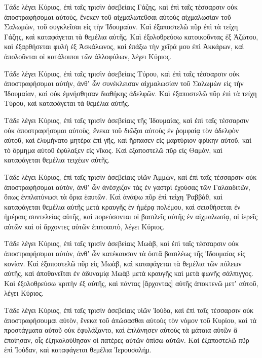 \begin{spacing}{1.1}
\begin{multicols}{2}
Τάδε λέγει Κύριος, ἐπὶ ταῖς τρισὶν ἀσεβείαις Γάζης, καὶ ἐπὶ ταῖς τέσσαρσιν οὐκ ἀποστραφήσομαι αὐτοὺς, ἕνεκεν τοῦ αἰχμαλωτεῦσαι αὐτοὺς αἰχμαλωσίαν τοῦ Σαλωμὼν, τοῦ συγκλεῖσαι εἰς τὴν Ἰδουμαίαν.
Καὶ ἐξαποστελῶ πῦρ ἐπὶ τὰ τείχη Γάζης, καὶ καταφάγεται τὰ θεμέλια αὐτῆς.
Καὶ ἐξολοθρεύσω κατοικοῦντας ἐξ Ἀζώτου, καὶ ἐξαρθήσεται φυλὴ ἐξ Ἀσκάλωνος, καὶ ἐπάξω τὴν χεῖρά μου ἐπὶ Ἀκκάρων, καὶ ἀπολοῦνται οἱ κατάλοιποι τῶν ἀλλοφύλων, λέγει Κύριος.

Τάδε λέγει Κύριος, ἐπὶ ταῖς τρισὶν ἀσεβείαις Τύρου, καὶ ἐπὶ ταῖς τέσσαρσιν οὐκ ἀποστραφήσομαι αὐτὴν, ἀνθʼ ὧν συνέκλεισαν αἰχμαλωσίαν τοῦ Σαλωμὼν εἰς τὴν Ἰδουμαίαν, καὶ οὐκ ἐμνήσθησαν διαθήκης ἀδελφῶν.
Καὶ ἐξαποστελῶ πῦρ ἐπὶ τὰ τείχη Τύρου, καὶ καταφάγεται τὰ θεμέλια αὐτῆς.

Τάδε λέγει Κύριος, ἐπὶ ταῖς τρισὶν ἀσεβείαις τῆς Ἰδουμαίας, καὶ ἐπὶ ταῖς τέσσαρσιν οὐκ ἀποστραφήσομαι αὐτοὺς, ἕνεκα τοῦ διῶξαι αὐτοὺς ἐν ῥομφαίᾳ τὸν ἀδελφὸν αὐτοῦ, καὶ ἐλυμήνατο μητέρα ἐπὶ γῆς, καὶ ἥρπασεν εἰς μαρτύριον φρίκην αὐτοῦ, καὶ τὸ ὅρμημα αὐτοῦ ἐφύλαξεν εἰς νῖκος.
Καὶ ἐξαποστελῶ πῦρ εἰς Θαμὰν, καὶ καταφάγεται θεμέλια τειχέων αὐτῆς.

Τάδε λέγει Κύριος, ἐπὶ ταῖς τρισὶν ἀσεβείαις υἱῶν Ἀμμὼν, καὶ ἐπὶ ταῖς τέσσαρσιν οὐκ ἀποστραφήσομαι αὐτὸν, ἀνθʼ ὧν ἀνέσχιζον τὰς ἐν γαστρὶ ἐχούσας τῶν Γαλααδιτῶν, ὅπως ἐνπλατύνωσι τὰ ὅρια ἑαυτῶν.
Καὶ ἀνάψω πῦρ ἐπὶ τεὶχη Ῥαββὰθ, καὶ καταφάγεται θεμέλια αὐτῆς μετὰ κραυγῆς ἐν ἡμέρᾳ πολέμου, καὶ σεισθήσεται ἐν ἡμέραις συντελείας αὐτῆς,
καὶ πορεύσονται οἱ βασιλεῖς αὐτῆς ἐν αἰχμαλωσίᾳ, οἱ ἱερεῖς αὐτῶν καὶ οἱ ἄρχοντες αὐτῶν ἐπιτοαυτὸ, λέγει Κύριος.

Τάδε λέγει Κύριος, ἐπὶ ταῖς τρισὶν ἀσεβείαις Μωὰβ, καὶ ἐπὶ ταῖς τέσσαρσιν οὐκ ἀποστραφήσομαι αὐτὸν, ἀνθʼ ὧν κατέκαυσαν τὰ ὀστᾶ βασιλέως τῆς Ἰδουμαίας εἰς κονίαν.
Καὶ ἐξαποστελῶ πῦρ εἰς Μωὰβ, καὶ καταφάγεται τὰ θεμέλια τῶν πόλεων αὐτῆς, καὶ ἀποθανεῖται ἐν ἀδυναμίᾳ Μωὰβ μετὰ κραυγῆς καὶ μετὰ φωνῆς σάλπιγγος.
Καὶ ἐξολοθρεύσω κριτὴν ἐξ αὐτῆς, καὶ πάντας [ἄρχοντας] αὐτῆς ἀποκτενῶ μετʼ αὐτοῦ, λέγει Κύριος.

Τάδε λέγει Κύριος, ἐπὶ ταῖς τρισὶν ἀσεβείαις υἱῶν Ἰούδα, καὶ ἐπὶ ταῖς τέσσαρσιν οὐκ ἀποστραφήσουμαι αὐτὸν, ἕνεκα τοῦ ἀπώσασθαι αὐτοὺς τὸν νόμον τοῦ Κυρίου, καὶ τὰ προστάγματα αὐτοῦ οὐκ ἐφυλάξαντο, καὶ ἐπλάνησεν αὐτοὺς τὰ μάταια αὐτῶν ἃ ἐποίησαν, οἷς ἐξηκολούθησαν οἱ πατέρες αὐτῶν ὀπίσω αὐτῶν.
Καὶ ἐξαποστελῶ πῦρ ἐπὶ Ἰούδαν, καὶ καταφάγεται θεμέλια Ἱερουσαλήμ.


\end{multicols}
\end{spacing}
